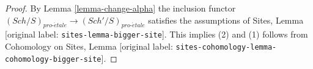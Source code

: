 \documentclass[10pt,a4paper]{article}
\theoremstyle{plain}
\theoremstyle{definition}
\theoremstyle{remark}
\numberwithin{equation}{subsection}
\def\Sch{\mathit{Sch}}
\def\proetale{{pro\text{-}\acute{e}tale}}
\begin{document}
\begin{proof}
By Lemma \ref{lemma-change-alpha} the inclusion functor
$(\Sch/S)_\proetale \to (\Sch'/S)_\proetale$ satisfies the assumptions of
Sites, Lemma \textnormal{[original label: \nolinkurl{sites-lemma-bigger-site}]}. This implies (2) and (1)
follows from
Cohomology on Sites, Lemma \textnormal{[original label: \nolinkurl{sites-cohomology-lemma-cohomology-bigger-site}]}.
\end{proof}













\end{document}
